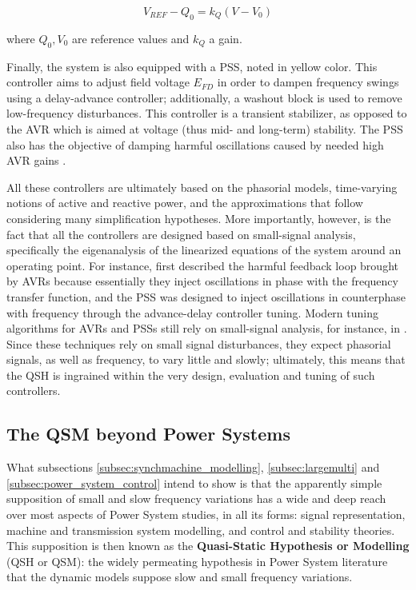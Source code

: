 \begin{equation} V_{REF} - Q_0 = k_Q\left(V - V_0\right) \end{equation}

	\noindent where $Q_0,V_0$ are reference values and $k_Q$ a gain.

	Finally, the system is also equipped with a PSS, noted in {\color{stewartyellow} yellow} color. This controller aims to adjust field voltage $E_{FD}$ in order to dampen frequency swings using a delay-advance controller; additionally, a washout block is used to remove low-frequency disturbances. This controller is a transient stabilizer, as opposed to the AVR which is aimed at voltage (thus mid- and long-term) stability. The PSS also has the objective of damping harmful oscillations caused by needed high AVR gains .

	All these controllers are ultimately based on the phasorial models, time-varying notions of active and reactive power, and the approximations that follow considering many simplification hypotheses. More importantly, however, is the fact that all the controllers are designed based on small-signal analysis, specifically the eigenanalysis of the linearized equations of the system around an operating point. For instance, \cite{demelloConceptsSynchronousMachine1969} first described the harmful feedback loop brought by AVRs because essentially they inject oscillations in phase with the frequency transfer function, and the PSS was designed to inject oscillations in counterphase with frequency through the advance-delay controller tuning. Modern tuning algorithms for AVRs and PSSs still rely on small-signal analysis, for instance, in \cite{kimNovelControlStrategy2023,xuSmallSignalStabilityAnalysis2024,sarkarFractionalOrderPIDPSS2025}. Since these techniques rely on small signal disturbances, they expect phasorial signals, as well as frequency, to vary little and slowly; ultimately, this means that the QSH is ingrained within the very design, evaluation and tuning of such controllers.

\subsection{The QSM beyond Power Systems} %

	What subsections \ref{subsec:synchmachine_modelling}, \ref{subsec:largemulti} and \ref{subsec:power_system_control} intend to show is that the apparently simple supposition of small and slow frequency variations has a wide and deep reach over most aspects of Power System studies, in all its forms: signal representation, machine and transmission system modelling, and control and stability theories. This supposition is then known as the \textbf{Quasi-Static Hypothesis or Modelling} (QSH or QSM): the widely permeating hypothesis in Power System literature that the dynamic models suppose slow and small frequency variations.

